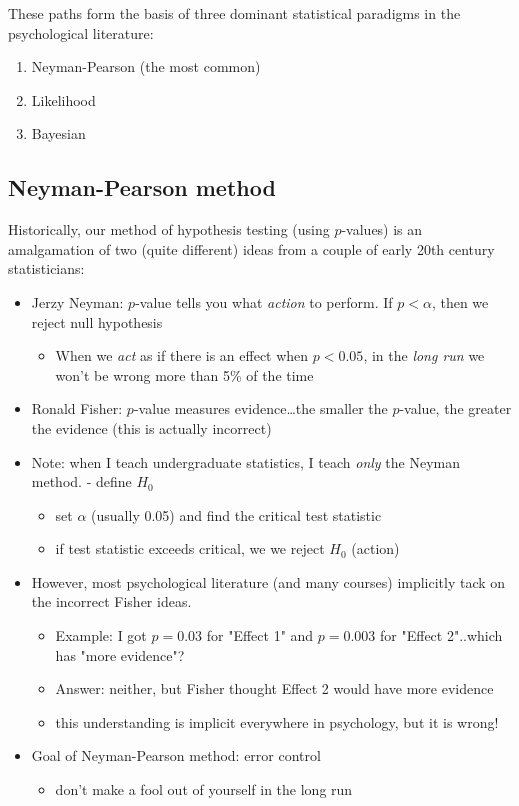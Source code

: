 \documentclass[11pt]{article}
\begin{document}
These paths form the basis of three dominant statistical paradigms in the psychological literature:
\begin{enumerate}
\item Neyman-Pearson (the most common)
\item Likelihood
\item Bayesian
\end{enumerate}

\subsection*{Neyman-Pearson method}
\label{sec-3-1}

Historically, our method of hypothesis testing (using $p$-values) is an amalgamation of two (quite different) ideas from a couple of early 20th century statisticians:

\begin{itemize}
\item Jerzy Neyman: $p$-value tells you what \emph{action} to perform.  If $p<\alpha$, then we reject null hypothesis
\begin{itemize}
\item When we \emph{act} as if there is an effect when $p<0.05$, in the \emph{long run} we won't be wrong more than 5\% of the time
\end{itemize}
\item Ronald Fisher: $p$-value measures evidence\ldots{}the smaller the $p$-value, the greater the evidence (this is actually incorrect)
\item Note: when I teach undergraduate statistics, I teach \emph{only} the Neyman method.  - define $H_0$
\begin{itemize}
\item set $\alpha$ (usually 0.05) and find the critical test statistic
\item if test statistic exceeds critical, we we reject $H_0$ (action)
\end{itemize}
\item However, most psychological literature (and many courses) implicitly tack on the incorrect Fisher ideas.  
\begin{itemize}
\item Example: I got $p=0.03$ for "Effect 1" and $p=0.003$ for "Effect 2"..which has "more evidence"?
\item Answer: neither, but Fisher thought Effect 2 would have more evidence
\item this understanding is implicit everywhere in psychology, but it is wrong!
\end{itemize}
\item Goal of Neyman-Pearson method: error control
\begin{itemize}
\item don't make a fool out of yourself in the long run
\end{itemize}
\end{itemize}
\end{document}
